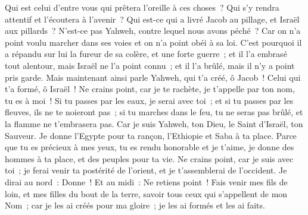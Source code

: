 \begin{multicols}{2}
Qui est celui d'entre vous qui prêtera l'oreille à ces choses~? Qui s'y rendra attentif et l'écoutera à l'avenir~?
Qui est-ce qui a livré Jacob au pillage, et Israël aux pillards~? N'est-ce pas Yahweh, contre lequel nous avons péché~? Car on n'a point voulu marcher dans ses voies et on n'a point obéi à sa loi.
C'est pourquoi il a répandu sur lui la fureur de sa colère, et une forte guerre~; et il l'a embrasé tout alentour, mais Israël ne l'a point connu~; et il l'a brûlé, mais il n'y a point pris garde.
\VerseOne{}Mais maintenant ainsi parle Yahweh, qui t'a créé, ô Jacob~! Celui qui t'a formé, ô Israël~! Ne crains point, car je te rachète, je t'appelle par ton nom, tu es à moi~!
Si tu passes par les eaux, je serai avec toi~; et si tu passes par les fleuves, ils ne te noieront pas~; si tu marches dans le feu, tu ne seras pas brûlé, et la flamme ne t'embrasera pas.
Car je suis Yahweh, ton Dieu, le Saint d'Israël, ton Sauveur. Je donne l'Egypte pour ta rançon, l'Ethiopie et Saba à ta place.
Parce que tu es précieux à mes yeux, tu es rendu honorable et je t'aime, je donne des hommes à ta place, et des peuples pour ta vie.
Ne crains point, car je suis avec toi~; je ferai venir ta postérité de l'orient, et je t'assemblerai de l'occident.
Je dirai au nord~: Donne~! Et au midi~: Ne retiens point~! Fais venir mes fils de loin, et mes filles du bout de la terre,
savoir tous ceux qui s'appellent de mon Nom~; car je les ai créés pour ma gloire~; je les ai formés et les ai faits.

\end{multicols}
